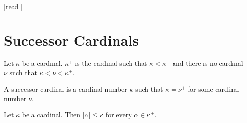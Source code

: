 \documentclass[10pt]{article}
\begin{document}
  \begin{imports}
    \begin{forthel}
      [read ]
    \end{forthel}
  \end{imports}


  \section*{Successor Cardinals}

  \begin{forthel}
    \begin{definition}[id=SET_THEORY_06_9568425123021254,printid]
      Let $\kappa$ be a cardinal.
      $\kappa^+$ is the cardinal such that $\kappa < \kappa^+$ and there is no cardinal $\nu$ such that $\kappa < \nu < \kappa^+$.
    \end{definition}
  \end{forthel}

  \begin{forthel}
    \begin{definition}[id=SET_THEORY_06_6818986081648640,printid]
      A successor cardinal is a cardinal number $\kappa$ such that $\kappa = \nu^+$ for some cardinal number $\nu$.
    \end{definition}
  \end{forthel}

  \begin{forthel}
    \begin{proposition}[id=SET_THEORY_06_5231202126545218,printid]
      Let $\kappa$ be a cardinal.
      Then $|\alpha| \leq \kappa$ for every $\alpha \in \kappa^+$.
    \end{proposition}
  \end{forthel}
\end{document}
